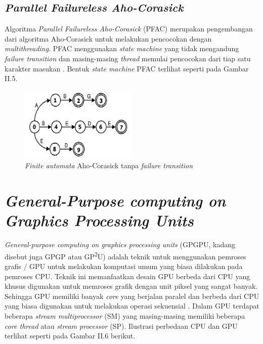 
  \subsection {\emph{Parallel Failureless Aho-Corasick}}

    Algoritma \emph{Parallel Failureless Aho-Corasick} (PFAC) merupakan pengembangan dari algoritma Aho-Corasick untuk melakukan pencocokan dengan \emph{multithreading}. PFAC menggunakan \emph{state machine} yang tidak mengandung \emph{failure transition} dan masing-masing \emph{thread} memulai pencocokan dari tiap satu karakter masukan \citep{lin2013}. Bentuk \emph{state machine} PFAC terlihat seperti pada Gambar II.5.

    \begin{figure}[htb]
      \centering
      \includegraphics[width=0.5\textwidth]{resources/pfac.png}
      \caption[\emph{Finite automata} Aho-Corasick tanpa \emph{failure transition}]{\emph{Finite automata} Aho-Corasick tanpa \emph{failure transition} \citep{lin2013}}
    \end{figure}
    
    \section{\emph{General-Purpose computing on Graphics Processing Units}}
    
    \emph{General-purpose computing on graphics processing units} (GPGPU, kadang disebut juga GPGP atau GP\textsuperscript{2}U) adalah teknik untuk menggunakan pemroses grafis / GPU untuk melakukan komputasi umum yang biasa dilakukan pada pemroses CPU. Teknik ini memanfaatkan desain GPU berbeda dari CPU yang khusus digunakan untuk memroses grafik dengan unit piksel yang sangat banyak. Sehingga GPU memiliki banyak \emph{core} yang berjalan paralel dan berbeda dari CPU yang biasa digunakan untuk melakukan operasi sekuensial \citep{lindholm2001}. Dalam GPU terdapat beberapa \emph{stream multiprocessor} (SM) yang masing-masing memiliki beberapa \emph{core thread} atau \emph{stream processor} (SP). Ilustrasi perbedaan CPU dan GPU terlihat seperti pada Gambar II.6 berikut.

